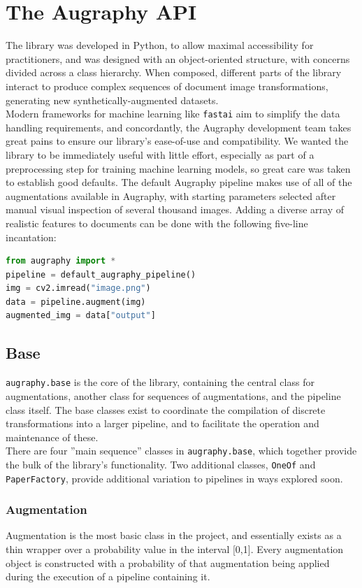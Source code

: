 \documentclass[runningheads]{llncs}
\begin{document}
\section{The Augraphy API}
The library was developed in Python, to allow maximal accessibility for practitioners, and was designed with an object-oriented structure, with concerns divided across a class hierarchy. When composed, different parts of the library interact to produce complex sequences of document image transformations, generating new synthetically-augmented datasets.\\

Modern frameworks for machine learning like \texttt{fastai} \cite{ref_fastai} aim to simplify the data handling requirements, and concordantly, the Augraphy development team takes great pains to ensure our library's ease-of-use and compatibility. We wanted the library to be immediately useful with little effort, especially as part of a preprocessing step for training machine learning models, so great care was taken to establish good defaults. The default Augraphy pipeline makes use of all of the augmentations available in Augraphy, with starting parameters selected after manual visual inspection of several thousand images. Adding a diverse array of realistic features to documents can be done with the following five-line incantation:
\begin{lstlisting}[language=Python]
from augraphy import *
pipeline = default_augraphy_pipeline()
img = cv2.imread("image.png")
data = pipeline.augment(img)
augmented_img = data["output"]
\end{lstlisting}

\subsection{Base}
\texttt{augraphy.base} is the core of the library, containing the central class for augmentations, another class for sequences of augmentations, and the pipeline class itself. The base classes exist to coordinate the compilation of discrete transformations into a larger pipeline, and to facilitate the operation and maintenance of these.\\

There are four ''main sequence'' classes in \texttt{augraphy.base}, which together provide the bulk of the library's functionality. Two additional classes, \texttt{OneOf} and \texttt{PaperFactory}, provide additional variation to pipelines in ways explored soon.

\subsubsection{Augmentation}
Augmentation is the most basic class in the project, and essentially exists as a thin wrapper over a probability value in the interval [0,1]. Every augmentation object is constructed with a probability of that augmentation being applied during the execution of a pipeline containing it.\\
\end{document}
